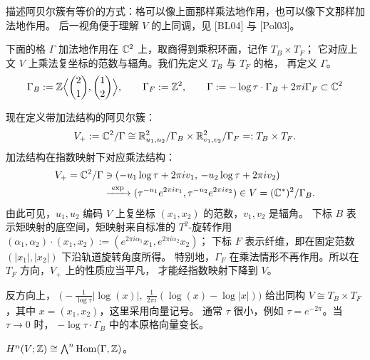 \begin{remark}[阿贝尔簇的乘法格与加法格视角]\label{rem:additive-mult}
描述阿贝尔簇有等价的方式：格可以像上面那样乘法地作用，也可以像下文那样加法地作用。
后一视角便于理解 $V$ 的上同调，见 [BL04] 与 [Pol03]。

下面的格 $\Gamma$ 加法地作用在 $\mathbb{C}^2$ 上，取商得到乘积环面，记作 $T_B\times T_F$；
它对应上文 $V$ 上乘法复坐标的范数与辐角。我们先定义 $T_B$ 与 $T_F$ 的格，
再定义 $\Gamma$。
\begin{equation}\label{eq:1-3}
\Gamma_B := \mathbb{Z}\Bigl\langle\binom{2}{1},\binom{1}{2}\Bigr\rangle,
\qquad \Gamma_F := \mathbb{Z}^2,
\qquad \Gamma := -\log\tau\cdot\Gamma_B+2\pi i\Gamma_F\subset\mathbb{C}^2
\end{equation}
\end{remark}


现在定义带加法结构的阿贝尔簇：
\[
V_+ := \mathbb{C}^2/\Gamma \cong \mathbb{R}^2_{u_1,u_2}/\Gamma_B\times\mathbb{R}^2_{v_1,v_2}/\Gamma_F
=: T_B\times T_F.
\]
加法结构在指数映射下对应乘法结构：
\[
\begin{aligned}
V_+ = \mathbb{C}^2/\Gamma &\ni (-u_1\log\tau+2\pi iv_1,\,-u_2\log\tau+2\pi iv_2)\\
&\xrightarrow{\ \exp\ }
(\tau^{-u_1}e^{2\pi iv_1},\tau^{-u_2}e^{2\pi iv_2})\in V=(\mathbb{C}^*)^2/\Gamma_B.
\end{aligned}
\]
由此可见，$u_1,u_2$ 编码 $V$ 上复坐标 $(x_1,x_2)$ 的范数，$v_1,v_2$ 是辐角。
下标 $B$ 表示矩映射的底空间，矩映射来自标准的 $T^2$-旋转作用
$(\alpha_1,\alpha_2)\cdot(x_1,x_2) := (e^{2\pi i\alpha_1}x_1,e^{2\pi i\alpha_2}x_2)$；
下标 $F$ 表示纤维，即在固定范数 $(|x_1|,|x_2|)$ 下沿轨道旋转角度所得。
特别地，$\Gamma_F$ 在乘法情形不再作用。所以在 $T_F$ 方向，$V_+$ 上的性质应当平凡，
才能经指数映射下降到 $V$。

反方向上，
$\bigl(-\frac{1}{\log\tau}|\log(x)|,\ \frac{1}{2\pi i}(\log(x)-\log|x|)\bigr)$
给出同构 $V\cong T_B\times T_F$，其中 $x=(x_1,x_2)$，这里采用向量记号。
通常 $\tau$ 很小，例如 $\tau=e^{-2\pi}$。当 $\tau\to0$ 时，
$-\log\tau\cdot\Gamma_B$ 中的本原格向量变长。

\begin{claim}\label{claim:cohomology}
$H^n(V;\mathbb{Z})\cong\bigwedge^n\operatorname{Hom}(\Gamma,\mathbb{Z})$。
\end{claim}

